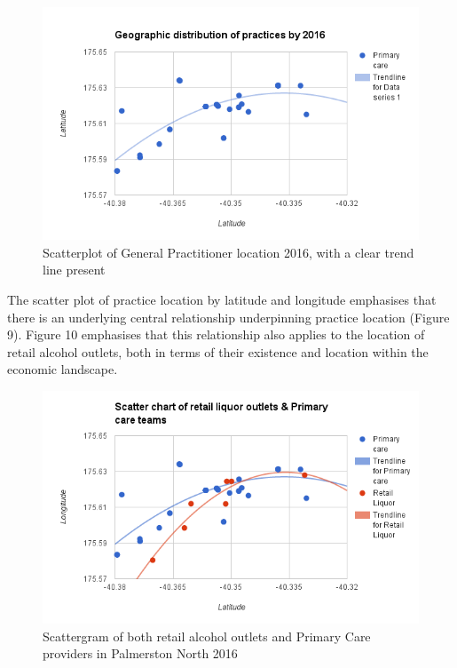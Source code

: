 \documentclass[11pt,a4paper]{article}
\begin{document}
\begin{figure}[htp]
\centering
\includegraphics[scale=0.6]{Nash_GP_2016.png}
\caption{Scatterplot of General Practitioner location 2016, with a clear trend line present}
\label{Scatter plot of General Practitioner locations}
\end{figure}


The scatter plot of practice location by latitude and longitude emphasises that there is an underlying central relationship underpinning practice location (Figure 9). Figure 10 emphasises that this relationship also applies to the location of retail alcohol outlets, both in terms of their existence and location within the economic landscape.\\


\begin{figure}[htp]
\centering
\includegraphics[scale=0.6]{Nash_GP_retail.png}
\caption{ Scattergram of both retail alcohol outlets and Primary Care providers in Palmerston North 2016}
\label{Geographic distribution of practices by 2016, with retail outlets overlaid}
\end{figure}
\end{document}

